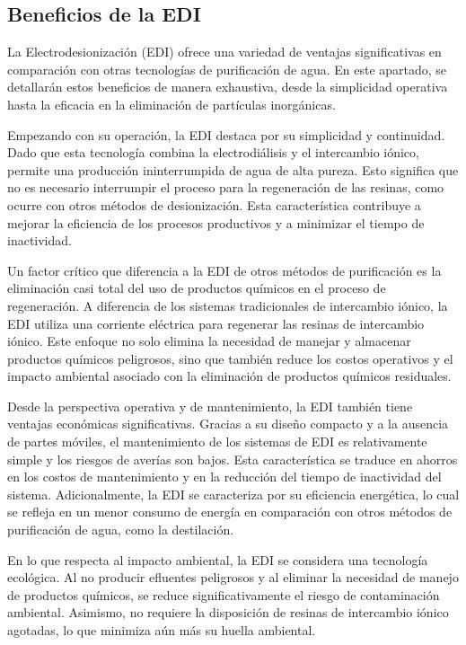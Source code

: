\subsection{Beneficios de la EDI}
La Electrodesionización (EDI) ofrece una variedad de ventajas significativas en comparación con otras tecnologías de
purificación de agua. En este apartado, se detallarán estos beneficios de manera exhaustiva, desde la simplicidad operativa
hasta la eficacia en la eliminación de partículas inorgánicas.

Empezando con su operación, la EDI destaca por su simplicidad y continuidad. Dado que esta tecnología combina la electrodiálisis
y el intercambio iónico, permite una producción ininterrumpida de agua de alta pureza. Esto significa que no es necesario
interrumpir el proceso para la regeneración de las resinas, como ocurre con otros métodos de desionización. Esta característica
contribuye a mejorar la eficiencia de los procesos productivos y a minimizar el tiempo de inactividad.

Un factor crítico que diferencia a la EDI de otros métodos de purificación es la eliminación casi total del uso de productos
químicos en el proceso de regeneración. A diferencia de los sistemas tradicionales de intercambio iónico, la EDI utiliza una
corriente eléctrica para regenerar las resinas de intercambio iónico. Este enfoque no solo elimina la necesidad de manejar
y almacenar productos químicos peligrosos, sino que también reduce los costos operativos y el impacto ambiental asociado con
la eliminación de productos químicos residuales.

Desde la perspectiva operativa y de mantenimiento, la EDI también tiene ventajas económicas significativas. Gracias a su
diseño compacto y a la ausencia de partes móviles, el mantenimiento de los sistemas de EDI es relativamente simple y los
riesgos de averías son bajos. Esta característica se traduce en ahorros en los costos de mantenimiento y en la reducción
del tiempo de inactividad del sistema. Adicionalmente, la EDI se caracteriza por su eficiencia energética, lo cual se refleja
en un menor consumo de energía en comparación con otros métodos de purificación de agua, como la destilación.

En lo que respecta al impacto ambiental, la EDI se considera una tecnología ecológica. Al no producir efluentes peligrosos y
al eliminar la necesidad de manejo de productos químicos, se reduce significativamente el riesgo de contaminación ambiental.
Asimismo, no requiere la disposición de resinas de intercambio iónico agotadas, lo que minimiza aún más su huella ambiental.

